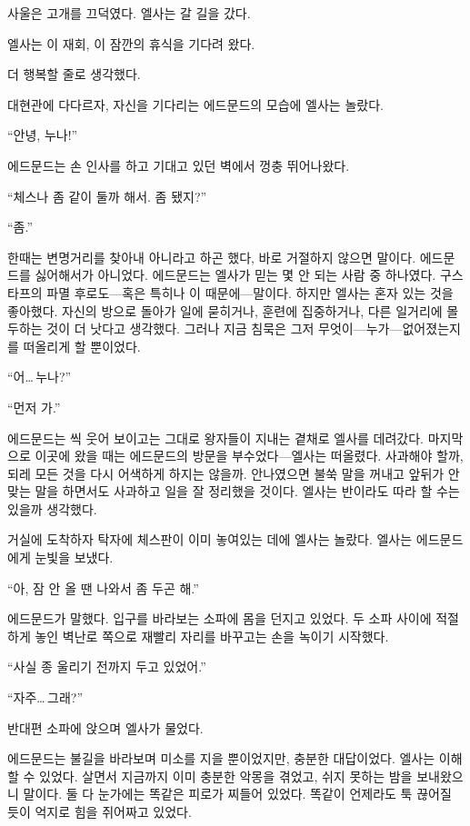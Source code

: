 사울은 고개를 끄덕였다. 엘사는 갈 길을 갔다.

엘사는 이 재회, 이 잠깐의 휴식을 기다려 왔다.

더 행복할 줄로 생각했다.

\textbreak

대현관에 다다르자, 자신을 기다리는 에드문드의 모습에 엘사는 놀랐다.

``안녕, 누나!''

에드문드는 손 인사를 하고 기대고 있던 벽에서 껑충 뛰어나왔다.

``체스나 좀 같이 둘까 해서. 좀 됐지?''

``좀.''

한때는 변명거리를 찾아내 아니라고 하곤 했다, 바로 거절하지 않으면 말이다. 에드문드를 싫어해서가 아니었다. 에드문드는 엘사가 믿는 몇 안 되는 사람 중 하나였다. 구스타프의 파멸 후로도—혹은 특히나 이 때문에—말이다. 하지만 엘사는 혼자 있는 것을 좋아했다. 자신의 방으로 돌아가 일에 묻히거나, 훈련에 집중하거나, 다른 일거리에 몰두하는 것이 더 낫다고 생각했다. 그러나 지금 침묵은 그저 무엇이—누가—없어졌는지를 떠올리게 할 뿐이었다.

``어\ldots\,누나?''

``먼저 가.''

에드문드는 씩 웃어 보이고는 그대로 왕자들이 지내는 곁채로 엘사를 데려갔다. 마지막으로 이곳에 왔을 때는 에드문드의 방문을 부수었다—엘사는 떠올렸다. 사과해야 할까, 되레 모든 것을 다시 어색하게 하지는 않을까. 안나였으면 불쑥 말을 꺼내고 앞뒤가 안 맞는 말을 하면서도 사과하고 일을 잘 정리했을 것이다. 엘사는 반이라도 따라 할 수는 있을까 생각했다.

거실에 도착하자 탁자에 체스판이 이미 놓여있는 데에 엘사는 놀랐다. 엘사는 에드문드에게 눈빛을 보냈다.

``아, 잠 안 올 땐 나와서 좀 두곤 해.''

에드문드가 말했다. 입구를 바라보는 소파에 몸을 던지고 있었다. 두 소파 사이에 적절하게 놓인 벽난로 쪽으로 재빨리 자리를 바꾸고는 손을 녹이기 시작했다.

``사실 종 울리기 전까지 두고 있었어.''

``자주\ldots\,그래?''

반대편 소파에 앉으며 엘사가 물었다.

에드문드는 불길을 바라보며 미소를 지을 뿐이었지만, 충분한 대답이었다. 엘사는 이해할 수 있었다. 살면서 지금까지 이미 충분한 악몽을 겪었고, 쉬지 못하는 밤을 보내왔으니 말이다. 둘 다 눈가에는 똑같은 피로가 찌들어 있었다. 똑같이 언제라도 툭 끊어질 듯이 억지로 힘을 쥐어짜고 있었다.

